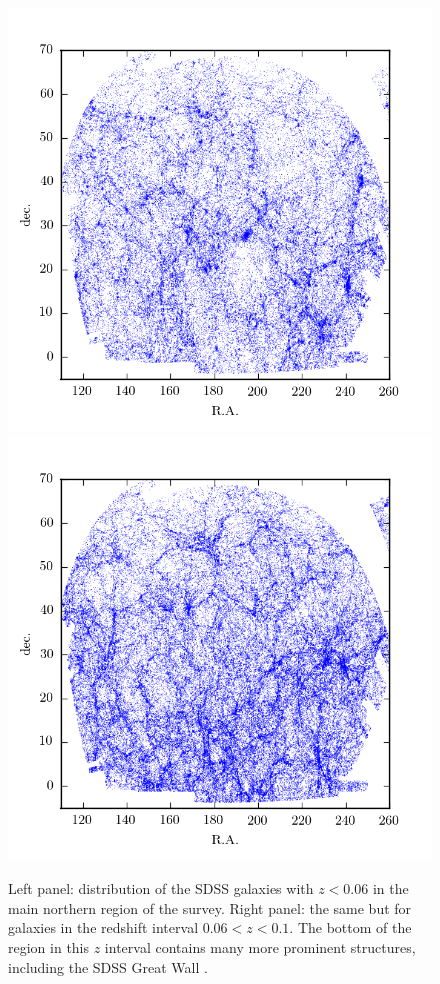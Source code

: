 \begin{figure}
\centerline{
\includegraphics[scale=0.85]{fig/sky_lss_z006.png}
\includegraphics[scale=0.85]{fig/sky_lss_z010.png}}
\caption{Left panel: distribution of the SDSS galaxies with $z<0.06$ in the main northern region of the survey. Right panel: the same but for galaxies in the redshift interval $0.06<z<0.1$.
The bottom of the region in this $z$ interval contains many more prominent structures, including the SDSS Great Wall \protect\href{http://adsabs.harvard.edu/abs/2005ApJ...624..463G}{\citep{gott_etal05}}. \label{fig:sky_lss}}
\end{figure}

